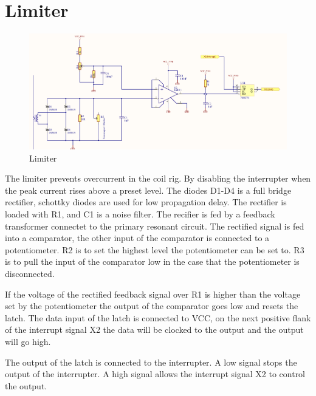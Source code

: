 \newpage
\section{Limiter}

\begin{figure}[h!]
    \centering
    \includegraphics[width=\textwidth]{Skjema/TK513_Limiter.pdf}
    \caption{Limiter}
    \label{fig:my_label}
\end{figure}

The limiter prevents overcurrent in the coil rig. By disabling the interrupter when the peak current rises above a preset level. The diodes D1-D4 is a full bridge rectifier, schottky diodes are used for low propagation delay. The rectifier is loaded with R1, and C1 is a noise filter. The recifier is fed by a feedback transformer connectet to the primary resonant circuit. The rectified signal is fed into a comparator, the other input of the comparator is connected to a potentiometer. R2 is to set the highest level the potentiometer can be set to. R3 is to pull the input of the comparator low in the case that the potentiometer is disconnected.

If the voltage of the rectified feedback signal over R1 is higher than the voltage set by the potentiometer the output of the comparator goes low and resets the latch. The data input of the latch is connected to VCC, on the next positive flank of the interrupt signal X2 the data will be clocked to the output and the output will go high.

The output of the latch is connected to the interrupter. A low signal stops the output of the interrupter. A high signal allows the interrupt signal X2 to control the output.



